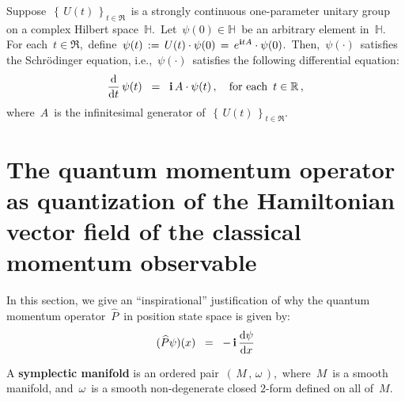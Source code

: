\vskip 0.3cm
\begin{remark}
\mbox{}
\vskip 0.05cm
\noindent
Suppose \,$\left\{\,U(t)\,\right\}_{t\in\Re}$\, is a strongly continuous one-parameter
unitary group on a complex Hilbert space \,$\mathbb{H}$.\,
Let \,$\psi(0) \in \mathbb{H}$\, be an arbitrary element in \,$\mathbb{H}$.\,
For each \,$t \in \Re$,\, define
\,$\psi(t) \,:=\, U(t)\cdot\psi(0) \,=\, e^{\mathbf{i} t A}\cdot\psi(0)$.\,
Then, \,$\psi(\cdot)$\, satisfies the {\color{red}Schr\"odinger equation}, i.e.,
\,$\psi(\cdot)$\, satisfies the following differential equation:
\begin{equation*}
\dfrac{\textnormal{d}}{\textnormal{d} t}\,\psi(t)
\;\; = \;\;
	\mathbf{i} \, A \cdot \psi(t)\,,
\quad
\textnormal{for each \,$t \in \mathbb{R}$}\,,
\end{equation*}
where \,$A$\, is the infinitesimal generator of
\,$\left\{\,U(t)\,\right\}_{t\in\Re}$.\,
\end{remark}


\vskip 0.5cm
\section{The quantum momentum operator as quantization of the Hamiltonian vector field of the classical momentum observable}

In this section, we give an ``inspirational'' justification
of why the quantum momentum operator \,$\widehat{P}$\,
in position state space is given by:
\begin{equation*}
(\widehat{P}\psi)(x)
\;\; = \;\;
	-\,\mathbf{i}\,\dfrac{\textnormal{d}\psi}{\textnormal{d} x}
\end{equation*}

\vskip 0.5cm
\begin{definition}
\mbox{}
\vskip 0.05cm
\noindent
A \textbf{symplectic manifold} is an ordered pair
\,$\left(\,M\,,\,\omega\,\right)$,\,
where \,$M$\, is a smooth manifold, and
\,$\omega$\, is a smooth non-degenerate closed $2$-form defined on all of \,$M$.\,
\end{definition}

